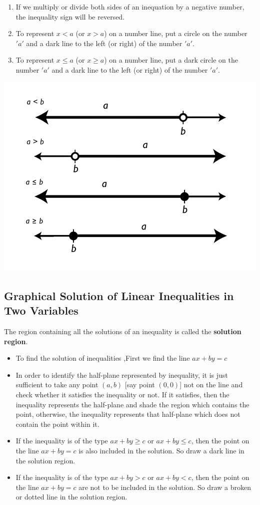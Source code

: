 \documentclass[12pt]{article}
\begin{document}
\begin{multicols}{2}
\begin{enumerate}
    \item If we multiply or divide both sides of an inequation by a negative number, the inequality sign will be reversed.
    \item To represent $x < a$ (or $x > a$) on a number line, put a circle on the number $'a'$ and a dark line to the left (or right) of the number $'a'$.
    \item To represent $x \leq a$ (or $x \geq a$) on a number line, put a dark circle on the number $'a'$ and a dark line to the left (or right) of the number $'a'$. 
\end{enumerate}
\includegraphics*[scale=0.7]{1.png}
\subsection*{Graphical Solution of Linear Inequalities in Two Variables}

The region containing all the solutions of an inequality is called the \textbf{solution region}.

\begin{itemize}
    \item To find the solution of inequalities ,First we find the line $ax+by=c$ 
    \item In order to identify the half-plane represented by inequality, it is just sufficient to take any point $(a, b)$ [say point $(0, 0)$] not on the line and check whether it satisfies the inequality or not. If it satisfies, then the inequality represents the half-plane and shade the region which contains the point, otherwise, the inequality represents that half-plane which does not contain the point within it.
    \item If the inequality is of the type $ax + by \geq c$ or $ax + by \leq c$, then the point on the line $ax + by = c$ is also included in the solution. So draw a dark line in the solution region.
    \item If the inequality is of the type $ax + by > c$ or $ax + by < c$, then the point on the line $ax + by = c$ are not to be included in the solution. So draw a broken or dotted line in the solution region.
\end{itemize}

\end{multicols}
\end{document}
